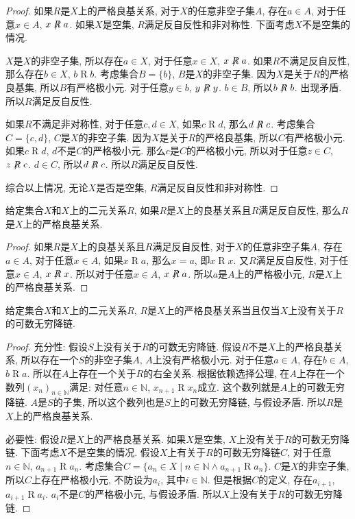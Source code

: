 \begin{proof}
	如果$R$是$X$上的严格良基关系, 对于$X$的任意非空子集$A$, 存在$a\in A$, 对于任意$x\in A$, $x\not \mathrel Ra$. 如果$X$是空集, $R$满足反自反性和非对称性. 下面考虑$X$不是空集的情况.
	
	$X$是$X$的非空子集, 所以存在$a\in X$, 对于任意$x\in X$, $x\not \mathrel Ra$. 如果$R$不满足反自反性, 那么存在$b\in X$, $b\mathrel Rb$. 考虑集合$B=\{b\}$, $B$是$X$的非空子集. 因为$X$是关于$R$的严格良基集, 所以$B$有严格极小元. 对于任意$y\in b$, $y\not \mathrel Ry$. $b\in B$, 所以$b\not \mathrel Rb$. 出现矛盾. 所以$R$满足反自反性.
	
	如果$R$不满足非对称性, 对于任意$c,d\in X$, 如果$c\mathrel Rd$, 那么$d\not \mathrel Rc$. 考虑集合$C=\{c,d\}$, $C$是$X$的非空子集. 因为$X$是关于$R$的严格良基集, 所以$C$有严格极小元. 如果$c\mathrel Rd$, $d$不是$C$的严格极小元. 那么$c$是$C$的严格极小元, 所以对于任意$z\in C$, $z\not \mathrel Rc$. $d\in C$, 所以$d\not \mathrel Rc$. 所以$R$满足反自反性.
	
	综合以上情况, 无论$X$是否是空集, $R$满足反自反性和非对称性.
\end{proof}

\begin{proposition}
	给定集合$X$和$X$上的二元关系$R$, 如果$R$是$X$上的良基关系且$R$满足反自反性, 那么$R$是$X$上的严格良基关系.
\end{proposition}

\begin{proof}
	如果$R$是$X$上的良基关系且$R$满足反自反性, 对于$X$的任意非空子集$A$, 存在$a\in A$, 对于任意$x\in A$, 如果$x\mathrel Ra$, 那么$x=a$, 即$x\mathrel Rx$. 又$R$满足反自反性, 对于任意$x\in A$, $x\not \mathrel Rx$. 所以对于任意$x\in A$, $x\not \mathrel Ra$. 所以$a$是$A$上的严格极小元, $R$是$X$上的严格良基关系.
\end{proof}

\begin{proposition}
	给定集合$X$和$X$上的二元关系$R$, $R$是$X$上的严格良基关系当且仅当$X$上没有关于$R$的可数无穷降链.
\end{proposition}

\begin{proof}
	充分性: 假设$S$上没有关于$R$的可数无穷降链. 假设$R$不是$X$上的严格良基关系, 所以存在一个$S$的非空子集$A$, $A$上没有严格极小元. 对于任意$a\in A$, 存在$b\in A$, $b\mathrel Ra$. 所以在$A$上存在一个关于$R$的右全关系. 根据依赖选择公理, 在$A$上存在一个数列$(x_n)_{n\in\mathbb N}$满足: 对任意$n\in \mathbb N$, $x_{n+1}\mathrel Rx_n$成立. 这个数列就是$A$上的可数无穷降链. $A$是$S$的子集, 所以这个数列也是$S$上的可数无穷降链, 与假设矛盾. 所以$R$是$X$上的严格良基关系.
	
	必要性: 假设$R$是$X$上的严格良基关系. 如果$X$是空集, $X$上没有关于$R$的可数无穷降链. 下面考虑$X$不是空集的情况. 假设$X$上有关于$R$的可数无穷降链$C$, 对于任意$n\in \mathbb N$, $a_{n+1}\mathrel Ra_n$. 考虑集合$C=\{a_n\in X\mid n\in \mathbb N\wedge a_{n+1}\mathrel Ra_n\}$. $C$是$X$的非空子集, 所以$C$上存在严格极小元, 不防设为$a_i$, 其中$i\in \mathbb N$. 但是根据$C$的定义, 存在$a_{i+1}$, $a_{i+1}\mathrel Ra_i$. $a_i$不是$C$的严格极小元, 与假设矛盾. 所以$X$上没有关于$R$的可数无穷降链.
\end{proof}

